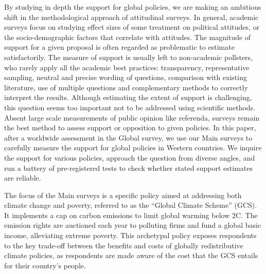 By studying in depth the support for global policies, we are making an ambitious shift in the methodological approach of attitudinal surveys. In general, academic surveys focus on studying effect sizes of some treatment on political attitudes, or the socio-demographic factors that correlate with attitudes.\cite{kuziemko_how_2015,douenne_yellow_2022} The magnitude of support for a given proposal is often regarded as problematic to estimate satisfactorily. %
The measure of support is usually left to non-academic pollsters, who rarely apply all the academic best practices: transparency, representative sampling, neutral and precise wording of questions, comparison with existing literature, use of multiple questions and complementary methods to correctly interpret the results. Although estimating the extent of support is challenging, this question seems too important not to be addressed using scientific methods. Absent large scale measurements of public opinion like referenda, surveys remain the best method to assess support or opposition to given policies. In this paper, after a worldwide assessment in the Global survey, we use our Main surveys to carefully measure the support for global policies in Western countries. We inquire the support for various policies, approach the question from diverse angles, and run a battery of pre-registered tests to check whether stated support estimates are reliable.

The focus of the Main surveys is a specific policy aimed at addressing both climate change and poverty, referred to as the ``Global Climate Scheme'' (GCS). It implements a cap on carbon emissions to limit global warming below 2\textdegree{}C. The emission rights are auctioned each year to polluting firms and fund a global basic income, alleviating extreme poverty. 
This archetypal policy exposes respondents to the key trade-off between the benefits and costs of globally redistributive climate policies, as respondents are made aware of the cost that the GCS entails for their country's people. 

